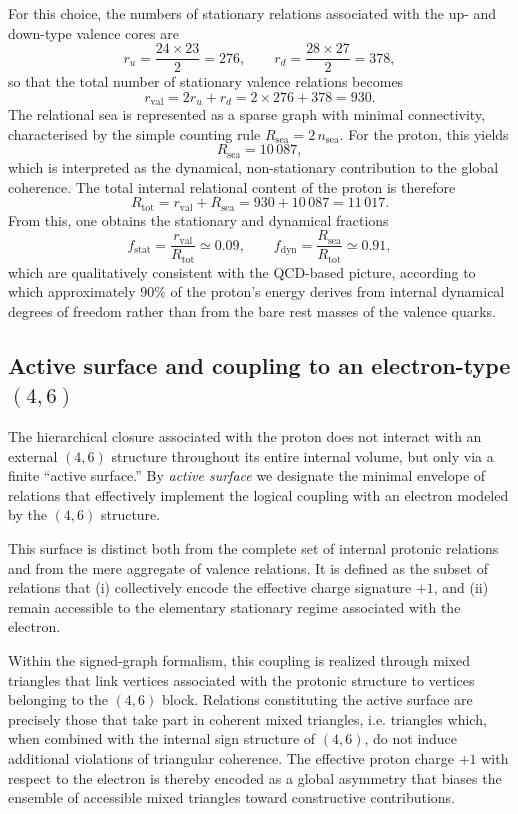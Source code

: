 \documentclass[12pt,a4paper]{article}
\begin{document}
For this choice, the numbers of stationary relations associated with the up- and down-type valence cores are
\[
  r_u = \frac{24\times 23}{2} = 276,
  \qquad
  r_d = \frac{28\times 27}{2} = 378,
\]
so that the total number of stationary valence relations becomes
\[
  r_{\text{val}} = 2r_u + r_d = 2\times 276 + 378 = 930.
\]
The relational sea is represented as a sparse graph with minimal connectivity, characterised by the simple counting rule \(R_{\text{sea}} = 2\,n_{\text{sea}}\). For the proton, this yields
\[
  R_{\text{sea}} = 10\,087,
\]
which is interpreted as the dynamical, non-stationary contribution to the global coherence. The total internal relational content of the proton is therefore
\[
  R_{\text{tot}} = r_{\text{val}} + R_{\text{sea}} = 930 + 10\,087 = 11\,017.
\]
From this, one obtains the stationary and dynamical fractions
\[
  f_{\text{stat}} = \frac{r_{\text{val}}}{R_{\text{tot}}} \simeq 0.09,
  \qquad
  f_{\text{dyn}} = \frac{R_{\text{sea}}}{R_{\text{tot}}} \simeq 0.91,
\]
which are qualitatively consistent with the QCD-based picture, according to which approximately \(90\%\) of the proton’s energy derives from internal dynamical degrees of freedom rather than from the bare rest masses of the valence quarks.\cite{Laubscher2026PDL_English,Laubscher2026LDP_French}

\subsection{Active surface and coupling to an electron-type \texorpdfstring{\((4,6)\)}{(4,6)}}

The hierarchical closure associated with the proton does not interact with an external \((4,6)\) structure throughout its entire internal volume, but only via a finite ``active surface.'' By \emph{active surface} we designate the minimal envelope of relations that effectively implement the logical coupling with an electron modeled by the \((4,6)\) structure. 

This surface is distinct both from the complete set of internal protonic relations and from the mere aggregate of valence relations. It is defined as the subset of relations that (i) collectively encode the effective charge signature \(+1\), and (ii) remain accessible to the elementary stationary regime associated with the electron.\cite{Laubscher2026LDP_French,Laubscher2026PDL_English}

Within the signed-graph formalism, this coupling is realized through mixed triangles that link vertices associated with the protonic structure to vertices belonging to the \((4,6)\) block.  
Relations constituting the active surface are precisely those that take part in coherent mixed triangles, i.e. triangles which, when combined with the internal sign structure of \((4,6)\), do not induce additional violations of triangular coherence.  
The effective proton charge \(+1\) with respect to the electron is thereby encoded as a global asymmetry that biases the ensemble of accessible mixed triangles toward constructive contributions.\cite{Laubscher2026LDP_French}
\end{document}
